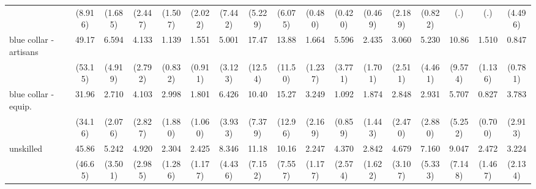 {\begin{tabular}{l*{16}{c}}
                    &     (8.916)         &     (1.685)         &     (2.447)         &     (1.507)         &     (2.022)         &     (7.442)         &     (5.229)         &     (6.075)         &     (0.480)         &     (0.420)         &     (0.469)         &     (2.189)         &     (0.822)         &         (.)         &         (.)         &     (4.496)         \\
[1em]
blue collar - artisans&       49.17\sym{***}&       6.594\sym{*}  &       4.133\sym{*}  &       1.139         &       1.551         &       5.001\sym{**} &       17.47\sym{***}&       13.88\sym{**} &       1.664         &       5.596\sym{*}  &       2.435         &       3.060         &       5.230         &       10.86\sym{**} &       1.510         &       0.847         \\
                    &     (53.15)         &     (4.919)         &     (2.792)         &     (0.832)         &     (0.911)         &     (3.123)         &     (12.54)         &     (11.50)         &     (1.237)         &     (3.771)         &     (1.701)         &     (2.511)         &     (4.461)         &     (9.574)         &     (1.136)         &     (0.781)         \\
[1em]
blue collar - equip.&       31.96\sym{**} &       2.710         &       4.103\sym{*}  &       2.998         &       1.801         &       6.426\sym{**} &       10.40\sym{***}&       15.27\sym{**} &       3.249         &       1.092         &       1.874         &       2.848         &       2.931         &       5.707         &       0.827         &       3.783         \\
                    &     (34.16)         &     (2.076)         &     (2.827)         &     (1.880)         &     (1.060)         &     (3.933)         &     (7.379)         &     (12.96)         &     (2.169)         &     (0.859)         &     (1.443)         &     (2.470)         &     (2.880)         &     (5.252)         &     (0.700)         &     (2.913)         \\
[1em]
unskilled           &       45.86\sym{***}&       5.242\sym{*}  &       4.920\sym{**} &       2.304         &       2.425         &       8.346\sym{***}&       11.18\sym{***}&       10.16\sym{**} &       2.247         &       4.370\sym{*}  &       2.842         &       4.679\sym{*}  &       7.160\sym{**} &       9.047\sym{**} &       2.472         &       3.224         \\
                    &     (46.65)         &     (3.501)         &     (2.985)         &     (1.286)         &     (1.177)         &     (4.436)         &     (7.152)         &     (7.557)         &     (1.177)         &     (2.574)         &     (1.622)         &     (3.107)         &     (5.333)         &     (7.148)         &     (1.467)         &     (2.134)         \\

\end{tabular}}
